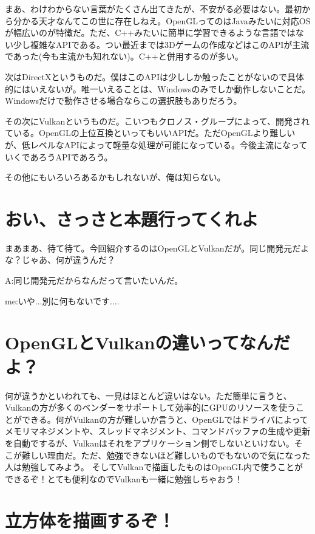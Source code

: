 \documentclass[12pt,a4paper]{jsarticle}
\begin{document}
まあ、わけわからない言葉がたくさん出てきたが、不安がる必要はない。最初から分かる天才なんてこの世に存在しねえ。OpenGLってのはJavaみたいに対応OSが幅広いのが特徴だ。ただ、C++みたいに簡単に学習できるような言語ではない少し複雑なAPIである。つい最近までは3Dゲームの作成などはこのAPIが主流であった(今も主流かも知れない)。C++と併用するのが多い。

次はDirectXというものだ。僕はこのAPIは少ししか触ったことがないので具体的にはいえないが。唯一いえることは、Windowsのみでしか動作しないことだ。Windowsだけで動作させる場合ならこの選択肢もありだろう。

その次にVulkanというものだ。こいつもクロノス・グループによって、開発されている。OpenGLの上位互換といってもいいAPIだ。ただOpenGLより難しいが、低レベルなAPIによって軽量な処理が可能になっている。今後主流になっていくであろうAPIであろう。

その他にもいろいろあるかもしれないが、俺は知らない。


\section{おい、さっさと本題行ってくれよ}
 まあまあ、待て待て。今回紹介するのはOpenGLとVulkanだが。同じ開発元だよな？じゃあ、何が違うんだ？
 
A:同じ開発元だからなんだって言いたいんだ。

me:いや...別に何もないです....

\section{OpenGLとVulkanの違いってなんだよ？}
 何が違うかといわれても、一見はほとんど違いはない。ただ簡単に言うと、Vulkanの方が多くのベンダーをサポートして効率的にGPUのリソースを使うことができる。何がVulkanの方が難しいか言うと、OpenGLではドライバによってメモリマネジメントや、スレッドマネジメント、コマンドバッファの生成や更新を自動でするが、Vulkanはそれをアプリケーション側でしないといけない。そこが難しい理由だ。ただ、勉強できないほど難しいものでもないので気になった人は勉強してみよう。
 そしてVulkanで描画したものはOpenGL内で使うことができるぞ！とても便利なのでVulkanも一緒に勉強しちゃおう！

\section{立方体を描画するぞ！}
\end{document}
